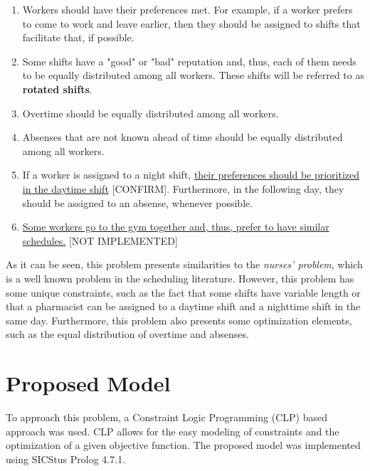 \documentclass[conference]{IEEEtran}
\def\NOIMPL#1{\ul{#1} {\color{blue}[NOT IMPLEMENTED]\color{black}}}
\def\CONFIRM#1{\ul{#1} {\color{red}[CONFIRM]\color{black}}}
\begin{document}
\begin{enumerate}[resume]
    \item {
        \label{criterion:worker-preferences}
        Workers should have their preferences met. For example, if a worker prefers to come to work and leave earlier, then they should be assigned to shifts that facilitate that, if possible.
    }
    \item {
        \label{criterion:rotated-shifts-distribution}
        Some shifts have a "good" or "bad" reputation and, thus, each of them needs to be equally distributed among all workers. These shifts will be referred to as \textbf{rotated shifts}.
    }
    \item {
        \label{criterion:overtime-distribution}
        Overtime should be equally distributed among all workers.
    }
    \item {
        \label{criterion:absenses-distribution}
        Absenses that are not known ahead of time should be equally distributed among all workers.
    }
    \item {
        \label{criterion:nighttime-workers-prioritzation}
        If a worker is assigned to a night shift, \CONFIRM{their preferences should be prioritized in the daytime shift}. Furthermore, in the following day, they should be assigned to an absense, whenever possible.
    }
    \item {
        \label{criterion:worker-groups}
        \NOIMPL{Some workers go to the gym together and, thus, prefer to have similar schedules.}
    }
\end{enumerate}

As it can be seen, this problem presents similarities to the \textit{nurses' problem}, which is a well known problem in the scheduling literature. However, this problem has some unique constraints, such as the fact that some shifts have variable length or that a pharmacist can be assigned to a daytime shift and a nighttime shift in the same day. Furthermore, this problem also presents some optimization elements, such as the equal distribution of overtime and absenses.

\section{Proposed Model}
\label{section:proposed-model}

To approach this problem, a Constraint Logic Programming (CLP) based approach was used. CLP allows for the easy modeling of constraints and the optimization of a given objective function.
The proposed model was implemented using SICStus Prolog 4.7.1. 
\end{document}
